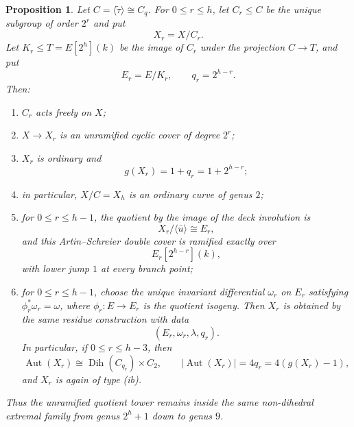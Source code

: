 \documentclass[11pt]{article}
\newtheorem{proposition}[theorem]{Proposition}
\theoremstyle{remark}
\newcommand{\Aut}{\operatorname{Aut}}
\newcommand{\Dih}{\operatorname{Dih}}
\begin{document}
\begin{proposition}\label{prop:tower}
Let $C=\langle\widetilde\tau\rangle\cong C_q$.  For
$0\le r\le h$, let $C_r\le C$ be the unique subgroup of order $2^r$ and
put
\[
 X_r=X/C_r.
\]
Let $K_r\le T=E[2^h](k)$ be the image of $C_r$ under the projection
$C\to T$, and put
\[
 E_r=E/K_r,\qquad q_r=2^{h-r}.
\]
Then:
\begin{enumerate}[label=\textup{(\roman*)}]
\item $C_r$ acts freely on $X$;
\item $X\to X_r$ is an unramified cyclic cover of degree $2^r$;
\item $X_r$ is ordinary and
\[
 g(X_r)=1+q_r=1+2^{h-r};
\]
\item in particular, $X/C=X_h$ is an ordinary curve of genus $2$;
\item for $0\le r\le h-1$, the quotient by the image of the deck
involution is
\[
 X_r/\langle\bar u\rangle\cong E_r,
\]
and this Artin--Schreier double cover is ramified exactly over
\[
 E_r[2^{h-r}](k),
\]
with lower jump $1$ at every branch point;
\item for $0\le r\le h-1$, choose the unique invariant differential
$\omega_r$ on $E_r$ satisfying $\phi_r^*\omega_r=\omega$, where
$\phi_r:E\to E_r$ is the quotient isogeny.  Then $X_r$ is obtained by the
same residue construction with data
\[
 (E_r,\omega_r,\lambda,q_r).
\]
In particular, if $0\le r\le h-3$, then
\[
 \Aut(X_r)\cong \Dih(C_{q_r})\times C_2,
 \qquad |\Aut(X_r)|=4q_r=4(g(X_r)-1),
\]
and $X_r$ is again of type \textup{(ib)}.
\end{enumerate}
Thus the unramified quotient tower remains inside the same non-dihedral
extremal family from genus $2^h+1$ down to genus $9$.
\end{proposition}
\end{document}
